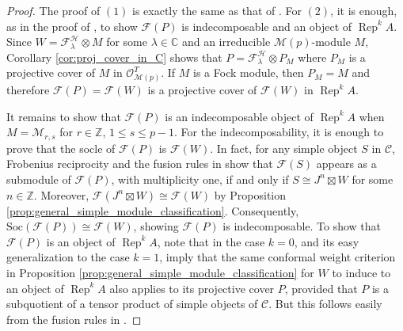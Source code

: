 \documentclass[11pt, reqno]{amsart}
\theoremstyle{definition}\newtheorem{defi}[thm]{Definition}
\theoremstyle{definition}\newtheorem{rem}[thm]{Remark}
\theoremstyle{definition}\newtheorem{exam}[thm]{Example}
\theoremstyle{definition}\newtheorem{assum}[thm]{Assumption}
\newcommand{\cH}{\mathcal{H}}
\newcommand{\cM}{\mathcal{M}}
\newcommand{\cF}{\mathcal{F}}
\newcommand{\cO}{\mathcal{O}}
\newcommand{\cC}{\mathcal{C}}
\newcommand{\CC}{\mathbb{C}}
\newcommand{\ZZ}{\mathbb{Z}}
\newcommand{\tens}{\boxtimes}
\DeclareMathOperator{\rep}{Rep}
\begin{document}
\begin{proof}
The proof of $(1)$ is exactly the same as that of \cite[Lemma~5.0.3]{CMY3}. For $(2)$, it is enough, as in the proof of \cite[Proposition 5.0.4]{CMY3}, to show $\cF(P)$ is indecomposable and an object of $\rep^k A$. Since $W=\cF_{\lambda}^{\cH} \otimes M$ for some $\lambda \in \CC$ and an irreducible $\cM(p)$-module $M$, Corollary \ref{cor:proj_cover_in_C} shows that $P = \cF_{\lambda}^{\cH} \otimes P_M$ where $P_M$ is a projective cover of $M$ in $\cO_{\cM(p)}^T$. If $M$ is a Fock module, then $P_M = M$ and therefore $\cF(P) = \cF(W)$ is a projective cover of $\cF(W)$ in $\rep^k A$. 

It remains to show that $\cF(P)$ is an indecomposable object of $\rep^k A$ when $M=\cM_{r,s}$ for $r\in\ZZ$, $1\leq s\leq p-1$. For the indecomposability, it is enough to prove that the socle of $\cF(P)$ is $\cF(W)$. In fact, for any simple object $S$ in $\cC$, Frobenius reciprocity and the fusion rules in \cite[Theorem~5.2.1]{CMY-singlet} show that $\cF(S)$ appears as a submodule of $\cF(P)$, with multiplicity one, if and only if $S \cong J^n \tens W$ for some $n \in \ZZ$. Moreover, $\cF(J^n\tens W)\cong\cF(W)$ by Proposition \ref{prop:general_simple_module_classification}. Consequently, $\mathrm{Soc}(\cF(P)) \cong \cF(W)$, showing $\cF(P)$ is indecomposable. To show that $\cF(P)$ is an object of $\rep^k A$, note that \cite[Theorem 1.4(1)]{CKL} in the case $k=0$, and its easy generalization to the case $k=1$, imply that the same conformal weight criterion in Proposition \ref{prop:general_simple_module_classification} for $W$ to induce to an object of $\rep^k A$ also applies to its projective cover $P$, provided that $P$ is a subquotient of a tensor product of simple objects of $\cC$. But this follows easily from the fusion rules in \cite[Theorems 3.2.8 and 5.1.4]{CMY-singlet}.


\end{proof}
\end{document}
